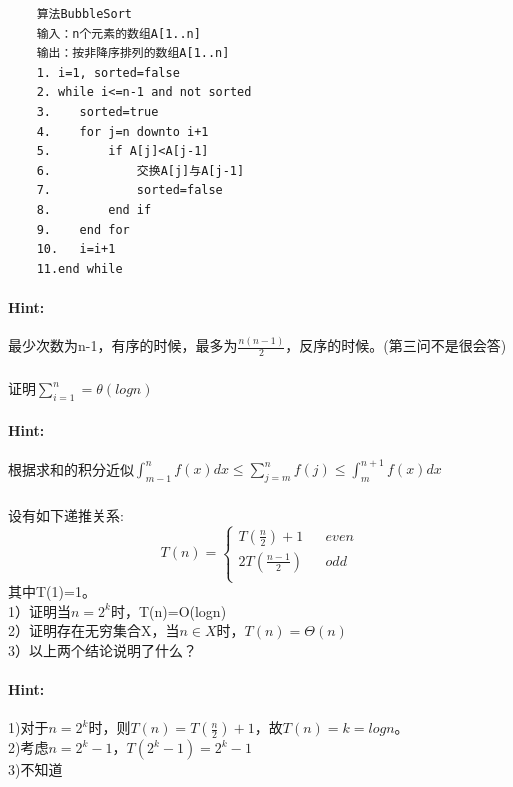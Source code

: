 \documentclass{article}
\begin{document}
    \lstset{language=C}
    \begin{lstlisting}
    算法BubbleSort
    输入：n个元素的数组A[1..n]
    输出：按非降序排列的数组A[1..n]
    1. i=1, sorted=false
    2. while i<=n-1 and not sorted
    3.    sorted=true
    4.    for j=n downto i+1
    5.        if A[j]<A[j-1] 
    6.            交换A[j]与A[j-1]
    7.            sorted=false
    8.        end if
    9.    end for
    10.   i=i+1
    11.end while
    \end{lstlisting}
     
     \paragraph{Hint:}最少次数为n-1，有序的时候，最多为$\frac{n(n-1)}{2}$，反序的时候。(第三问不是很会答)
     
     \subsubsection{}证明$\sum^{n}_{i=1} = \theta(logn)$
     \paragraph{Hint:}根据求和的积分近似$\int^{n}_{m-1}f(x)dx \leq \sum^{n}_{j=m}f(j) \leq \int^{n+1}_{m}f(x)dx$
     
     \subsubsection{}设有如下递推关系:
     $$ T(n)=\left\{
    \begin{aligned}
    T(\frac{n}{2}) +1 &  &even\\
    2T(\frac{n-1}{2})&  & odd\\
    \end{aligned}
    \right.
    $$
    其中T(1)=1。\\
1）证明当$n=2^k$时，T(n)=O(logn)\\
2）证明存在无穷集合X，当$n \in X$时，$T(n)=\Theta(n)$\\
3）以上两个结论说明了什么？\\
        
     \paragraph{Hint:}1)对于$n=2^k$时，则$T(n) = T(\frac{n}{2}) +1$，故$T(n) = k = log n $。\\
     2)考虑$n = 2^{k}-1$，$T(2^{k}-1) = 2^{k} -1$\\
     3)不知道
     
\end{document}
